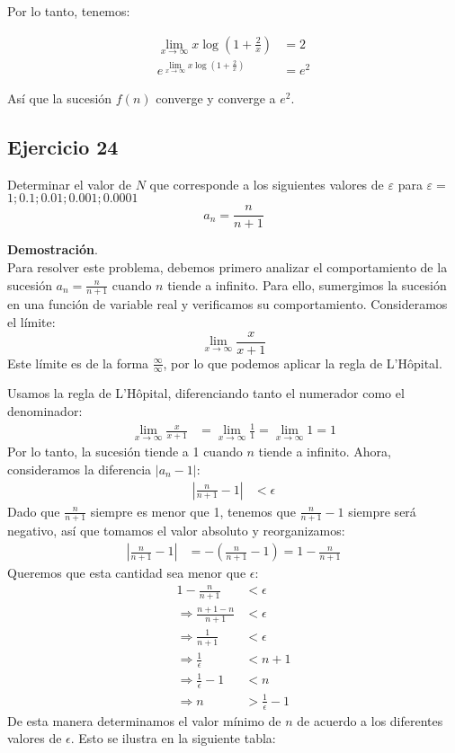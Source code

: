 \documentclass{article}
\begin{document}
    Por lo tanto, tenemos:

    \begin{align*}
    \lim_{x \rightarrow \infty} x \log \left(1+\frac{2}{x}\right) &= 2 \\
    e^{\lim_{x \rightarrow \infty} x \log \left(1+\frac{2}{x}\right)} &= e^2
    \end{align*}

    Así que la sucesión \( f(n) \) converge y converge a \( e^2 \).

    \subsection*{Ejercicio 24}
    Determinar el valor de $N$ que corresponde a los siguientes valores de $\varepsilon$ para $\varepsilon=$ $1 ; 0.1 ; 0.01 ; 0.001 ; 0.0001$
    $$
    a_{n}=\frac{n}{n+1}
    $$

    \textbf{Demostración}.\\

    Para resolver este problema, debemos primero analizar el comportamiento de la sucesión $a_n = \frac{n}{n+1}$ cuando $n$ tiende a infinito. Para ello, sumergimos la sucesión en una función de variable real y verificamos su comportamiento. Consideramos el límite:
    \[
    \lim _{x \rightarrow \infty} \frac{x}{x+1}
    \]
    Este límite es de la forma $\frac{\infty}{\infty}$, por lo que podemos aplicar la regla de L'Hôpital.

    Usamos la regla de L'Hôpital, diferenciando tanto el numerador como el denominador:
    \begin{align*}
    \lim _{x \rightarrow \infty} \frac{x}{x+1} &= \lim _{x \rightarrow \infty} \frac{1}{1} = \lim _{x \rightarrow \infty} 1 = 1
    \end{align*}
    Por lo tanto, la sucesión tiende a 1 cuando $n$ tiende a infinito. Ahora, consideramos la diferencia $|a_n - 1|$:
    \begin{align*}
    \left|\frac{n}{n+1} - 1\right| &< \epsilon
    \end{align*}
    Dado que $\frac{n}{n+1}$ siempre es menor que 1, tenemos que $\frac{n}{n+1} - 1$ siempre será negativo, así que tomamos el valor absoluto y reorganizamos:
    \begin{align*}
    \left|\frac{n}{n+1} - 1\right| &= -\left(\frac{n}{n+1} - 1\right) = 1 - \frac{n}{n+1}
    \end{align*}
    Queremos que esta cantidad sea menor que $\epsilon$:
    \begin{align*}
    1 - \frac{n}{n+1} &< \epsilon \\
    \Rightarrow \frac{n + 1 - n}{n + 1} &< \epsilon \\
    \Rightarrow \frac{1}{n + 1} &< \epsilon \\
    \Rightarrow \frac{1}{\epsilon} &< n + 1 \\
    \Rightarrow \frac{1}{\epsilon} - 1 &< n \\
    \Rightarrow n &> \frac{1}{\epsilon} - 1
    \end{align*}
    De esta manera determinamos el valor mínimo de $n$ de acuerdo a los diferentes valores de $\epsilon$. Esto se ilustra en la siguiente tabla:
\end{document}
